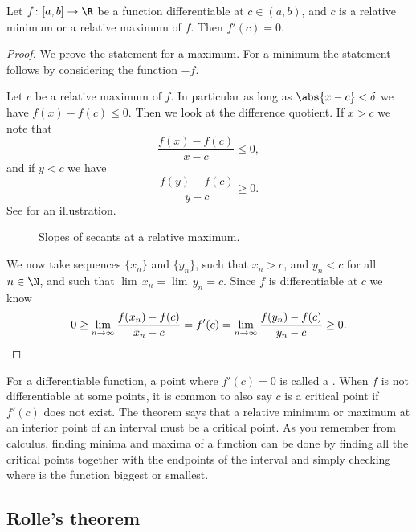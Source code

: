 \documentclass[12pt]{book}
\begin{document}
\begin{thm}\label{relminmax:thm}
Let $f \colon [a,b] \to \R$ be a function differentiable at $c \in (a,b)$,
and $c$
is a relative minimum or a relative maximum of $f$.
Then
$f'(c) = 0$.
\end{thm}

\begin{proof}
We prove the statement for a maximum.
For a minimum the statement
follows by considering the function $-f$.

Let $c$ be a relative maximum of $f$.
In particular as long
as $\abs{x-c} < \delta$ we have $f(x)-f(c) \leq 0$.
Then we look at the difference
quotient.
If $x > c$ we note that
\begin{equation*}
\frac{f(x)-f(c)}{x-c} \leq 0 ,
\end{equation*}
and if $y < c$ we have
\begin{equation*}
\frac{f(y)-f(c)}{y-c} \geq 0 .
\end{equation*}
See  for an illustration.
\begin{figure}[h!t]
\begin{center}

\caption{Slopes of secants at a relative maximum.\label{fig:critpt}}
\end{center}
\end{figure}

We now take sequences $\{ x_n\}$ and $\{ y_n \}$, such
that $x_n > c$, and
$y_n < c$ for all $n \in \N$, and such that
 $\lim\, x_n = \lim\, y_n = c$.
Since $f$
is differentiable at $c$ we know 
\begin{equation*}
0 \geq \lim_{n\to\infty} \frac{f(x_n)-f(c)}{x_n-c} 
=
f'(c)
=
\lim_{n\to\infty} \frac{f(y_n)-f(c)}{y_n-c} \geq 0.\qedhere
\end{equation*}
\end{proof}

For a differentiable function, a point where 
$f'(c) = 0$ is called a \emph{}.
When $f$ is not
differentiable at some points,
it is common to also say $c$ is a critical point
if $f'(c)$ does not exist.
The theorem says that a relative minimum or maximum at an interior point
of an interval must be a critical point.
As you remember from calculus, finding minima and maxima of a function can
be done by finding all the critical points together with the endpoints of
the interval and simply checking where is the function biggest or smallest.

\subsection*{Rolle's theorem}
\end{document}
